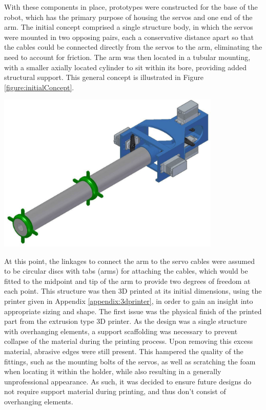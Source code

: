 \documentclass[11pt]{article}
\begin{document}
With these components in place, prototypes were constructed for the base of the robot, which has the primary purpose of housing the servos and one end of the arm. The initial concept comprised a single structure body, in which the servos were mounted in two opposing pairs, each a conservative distance apart so that the cables could be connected directly from the servos to the arm, eliminating the need to account for friction. The arm was then located in a tubular mounting, with a smaller axially located cylinder to sit within its bore, providing added structural support. This general concept is illustrated in Figure \ref{figure:initialConcept}.

\begin{center}
\includegraphics[width=0.8\textwidth]{images/initialConcept.png}
\label{figure:initialConcept}
\end{center}

At this point, the linkages to connect the arm to the servo cables were assumed to be circular discs with tabs (arms) for attaching the cables, which would be fitted to the midpoint and tip of the arm to provide two degrees of freedom at each point. This structure was then 3D printed at its initial dimensions, using the printer given in Appendix \ref{appendix:3dprinter}, in order to gain an insight into appropriate sizing and shape. The first issue was the physical finish of the printed part from the extrusion type 3D printer. As the design was a single structure with overhanging elements, a support scaffolding was necessary to prevent collapse of the material during the printing process. Upon removing this excess material, abrasive edges were still present. This hampered the quality of the fittings, such as the mounting bolts of the servos, as well as scratching the foam when locating it within the holder, while also resulting in a generally unprofessional appearance. As such, it was decided to ensure future designs do not require support material during printing, and thus don't consist of overhanging elements. 
\end{document}
